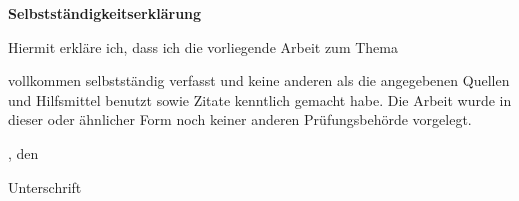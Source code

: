 \begin{center}
\textsf{\textbf{\large Selbstständigkeitserklärung}}
\end{center}
\noindent Hiermit erkläre ich, dass ich die vorliegende Arbeit zum Thema

\begin{center}
\textsf{\textbf{\docTitle}}
\end{center}

\noindent vollkommen selbstständig verfasst und keine anderen als die
angegebenen Quellen und Hilfsmittel benutzt sowie Zitate kenntlich gemacht
habe. Die Arbeit wurde in dieser oder ähnlicher Form noch keiner anderen
Prüfungsbehörde vorgelegt.
\vspace{3cm}

\noindent \docTown, den \docDate

\vspace{1.7cm}

\noindent Unterschrift
